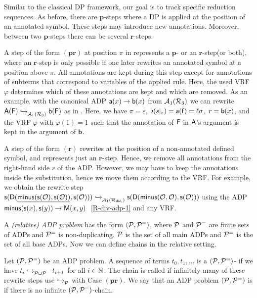 Similar to the classical DP framework, our goal is to track specific reduction
sequences. As before, 
there are $\mathbf{p}$-steps where
a DP is applied at the
position of an annotated symbol. These steps may
introduce new annotations. Moreover, 
between two $\mathbf{p}$-steps there can be
several $\mathbf{r}$-steps.

A step of the form $(\mathbf{pr})$ at position $\pi$ in  
represents  
a $\mathbf{p}$- or an  
$\mathbf{r}$-step\linebreak (or both), where an  
$\mathbf{r}$-step is only possible 
if one later rewrites an annotated symbol at a position above $\pi$.
All annotations are kept during this step except for annotations of subterms
that correspond to variables of the applied rule. Here, the used VRF $\varphi$ determines which of
these annotations are kept and which are removed.
As an example,
with the canonical ADP $\mathsf{a}(x) \to \mathsf{b}(x)$  from
$\mathcal{A}_{1}(\mathcal{R}_3)$ we can rewrite
$\mathsf{A}(\mathsf{F}) \mathrel{ \xhookrightarrow{{}_{\scriptstyle }} \!\!{}^{}_{\mathcal{A}_{1}(\mathcal{R}_3)} }  \mathsf{b}(\mathsf{F})$ as in .
Here, we have $\pi =
\varepsilon$, $\flat(s|_\varepsilon) = \mathsf{a}(\mathsf{f}) = \ell \sigma$, $r =
\mathsf{b}(x)$, and the VRF $\varphi$ with 
$\varphi(1) = 1$ such that the annotation of $\mathsf{F}$ in $\mathsf{A}$'s argument is
kept in the  argument of $\mathsf{b}$.

A step of the form $(\mathbf{r})$
rewrites at the position of a non-annotated defined symbol,
and represents just an $\mathbf{r}$-step.  
Hence, we remove all annotations
from the right-hand side $r$ of the ADP.
However, we may have to keep the annotations inside the substitution,
hence we move them according to the VRF.
For example, we obtain the rewrite step
$\mathsf{s}(\mathsf{D}(\underline{\mathsf{minus}(\mathsf{s}(\mathcal{O}),\mathsf{s}(\mathcal{O}))},\mathsf{s}(\mathcal{O}))) \mathrel{ \xhookrightarrow{{}_{\scriptstyle }} \!\!{}^{}_{\mathcal{A}_{1}(\mathcal{R}_{\mathsf{divL}})} }\mathsf{s}(\mathsf{D}(\mathsf{minus}(\mathcal{O},\mathcal{O}),\mathsf{s}(\mathcal{O})))$
using the ADP $\mathsf{minus}(\mathsf{s}(x),\mathsf{s}(y)) 
\to \mathsf{M}(x,y) \;$ \eqref{R-div-adp-1}
and any VRF.

A \emph{(relative) ADP problem} has the form
$(\mathcal{P},\mathcal{P}^{=})$, where $\mathcal{P}$ and $\mathcal{P}^{=}$ are finite sets of ADPs and $\mathcal{P}^{=}$
is non-duplicating. 
$\mathcal{P}$ is the set of all main ADPs and $\mathcal{P}^{=}$ is the set of all base ADPs.
Now we can define chains in the relative setting.

\begin{definition}\label{def:relative-rewrite-chain}
    Let $(\mathcal{P},\mathcal{P}^{=})$ be an ADP problem.
    A sequence of terms $t_0, t_1, \ldots$ is a
    $(\mathcal{P},\mathcal{P}^{=})$- if we have $t_i \mathrel{ \xhookrightarrow{{}_{\scriptstyle }} \!\!{}^{}_{\mathcal{P} \cup \mathcal{P}^{=}} }
    t_{i+1}$ for all $i \in \mathbb{N}$.
    The chain is called  if infinitely
    many of these rewrite steps use $\mathrel{ \xhookrightarrow{{}_{\scriptstyle }} \!\!{}^{}_{\mathcal{P}} }$
    with Case $(\mathbf{pr})$. 
    We say that an ADP problem $(\mathcal{P},\mathcal{P}^{=})$ is  if
    there is no infinite $(\mathcal{P},\mathcal{P}^{=})$-chain.
\end{definition}

